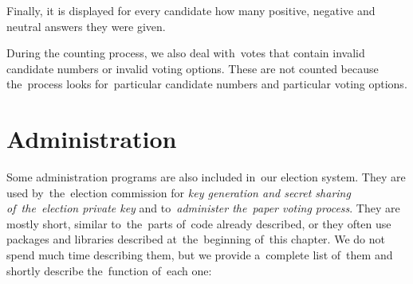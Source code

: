 Finally, it is displayed for every candidate how many positive, negative and neutral answers they were given.

During the counting process, we also deal with~votes that contain invalid candidate numbers or invalid voting options. These are not counted because the~process looks for~particular candidate numbers and particular voting options.

\section{Administration}
\label{sek:administration}
Some administration programs are also included in~our election system. They are used by~the~election commission for \emph{key generation and secret sharing of~the~election private key} and to~\emph{administer the~paper voting process}. They are mostly short, similar to~the~parts of~code already described, or they often use packages and libraries described at~the~beginning of~this chapter. We do not spend much time describing them, but we provide a~complete list of~them and shortly describe the~function of~each one:
